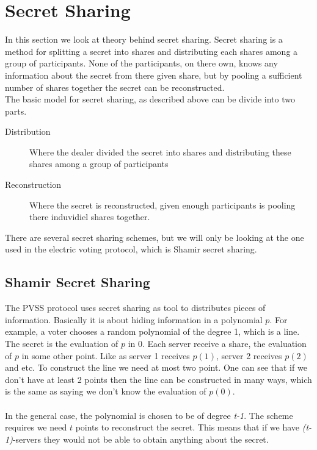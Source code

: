 \section{Secret Sharing}
In this section we look at theory behind secret sharing. Secret sharing is a method for splitting a secret into shares and distributing each shares among a group of participants. None of the participants, on there own, knows any information about the secret from there given share, but by pooling a sufficient number of shares together the secret can be reconstructed. \\

\noindent
The basic model for secret sharing, as described above can be divide into two parts. 

\begin{description}
    \item[Distribution] Where the dealer divided the secret into shares and distributing these shares among a group of participants 
    \item[Reconstruction] Where the secret is reconstructed, given enough participants is pooling there induvidiel shares together. 
\end{description}

\noindent
There are several secret sharing schemes, but we will only be looking at the one used in the electric voting protocol, which is Shamir secret sharing.

\subsection{Shamir Secret Sharing}
The PVSS protocol uses secret sharing as tool to distributes pieces of information. Basically it is about hiding information in a polynomial \begin{math}p\end{math}. For example, a voter chooses a random polynomial of the degree 1, which is a line. The secret is the evaluation of $p$ in \begin{math}0\end{math}. Each server receive a share, the evaluation of  \begin{math}p\end{math} in some other point. Like as server  1 receives  \begin{math}p(1)\end{math}, server 2 receives \begin{math}p(2)\end{math} and etc. To construct the line we need at most two point. One can see that if we don’t have at least 2 points then the line can be constructed in many ways, which is the same as saying we don’t know the evaluation of \begin{math}p(0)\end{math}.\\ \\
In the general case, the polynomial is chosen to be of degree \textit{t-1}. The scheme requires we need 
 \begin{math}t\end{math} points to reconstruct the secret. This means that if we have \textit{(t-1)}-servers they would not be able to obtain anything about the secret. 

